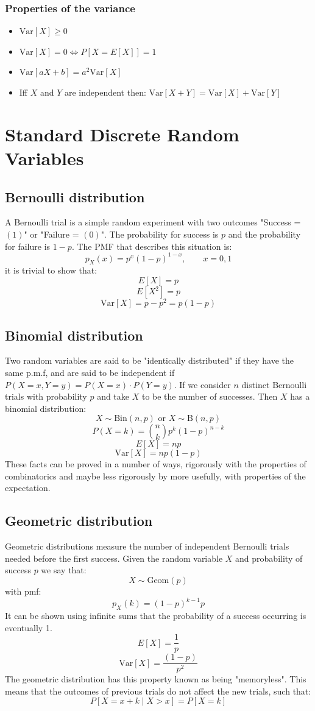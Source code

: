 \documentclass[12pt]{article}
\newcommand{\Var}[1]{\text{Var}[#1]}
\begin{document}
\subsubsection*{Properties of the variance}
\begin{itemize}
    \item \(\text{Var}[X]\geq0\)
    \item \(\text{Var}[X]=0\iff P[X=E[X]]=1\)
    \item \(\text{Var}[aX+b]=a^2\text{Var}[X]\)
    \item Iff \(X\) and \(Y\) are independent then: \(\Var{X+Y}=\Var{X}+\Var{Y}\)
\end{itemize}
\section{Standard Discrete Random Variables}
\subsection*{Bernoulli distribution}
A Bernoulli trial is a simple random experiment with two outcomes "Success = \((1)\)" or "Failure = \((0)\)". The probability for success is \(p\) and the probability for failure is \(1-p\). The PMF that describes this situation is:
\[p_X(x)=p^x(1-p)^{1-x},\qquad x=0,1\]
it is trivial to show that:
\[E[X]=p\]
\[E[X^2]=p\]
\[\Var{X}=p-p^2=p(1-p)\]
\subsection*{Binomial distribution}
Two random variables are said to be "identically distributed" if they have the same p.m.f, and are said to be independent if \(P(X=x,Y=y)=P(X=x)\cdot P(Y=y)\). If we consider \(n\) distinct Bernoulli trials with probability \(p\) and take \(X\) to be the number of successes. Then \(X\) has a binomial distribution:
\[X\sim \text{Bin}(n,p)\text{ or }X\sim \text{B}(n,p)\]
\[P(X=k)=\binom{n}{k}p^k(1-p)^{n-k}\]
\[E[X]=np\]
\[\Var{X}=np(1-p)\]
These facts can be proved in a number of ways, rigorously with the properties of combinatorics and maybe less rigorously by more usefully, with properties of the expectation.
\subsection*{Geometric distribution}
Geometric distributions measure the number of independent Bernoulli trials needed before the first success. Given the random variable \(X\) and probability of success \(p\) we say that:
\[X\sim\text{Geom}(p)\]
with pmf:
\[p_X(k)=(1-p)^{k-1}p\]
It can be shown using infinite sums that the probability of a success occurring is eventually 1.
\[E[X]=\frac{1}{p}\]
\[\Var{X}=\frac{(1-p)}{p^2}\]
The geometric distribution has this property known as being "memoryless". This means that the outcomes of previous trials do not affect the new trials, such that:
\[P[X=x+k \mid X> x]=P[X=k]\]
\end{document}
